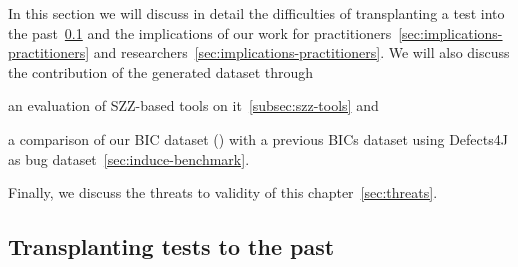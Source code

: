 
In this section we will discuss in detail the difficulties of transplanting a test into the past~\ref{sec:transplant-discuss} 
and the implications of our work for practitioners~\ref{sec:implications-practitioners} and researchers~\ref{sec:implications-practitioners}.
We will also discuss the contribution of the generated dataset through 
\begin{inparaenum}[\bf(1)]
    \item an evaluation of SZZ-based tools on it~\ref{subsec:szz-tools} and
    \item a comparison of our BIC dataset (\datasetName) with a previous BICs dataset using Defects4J as bug dataset~\ref{sec:induce-benchmark}.
\end{inparaenum}
Finally, we discuss the threats to validity of this chapter~\ref{sec:threats}.


\subsection{Transplanting tests to the past}
\label{sec:transplant-discuss}





